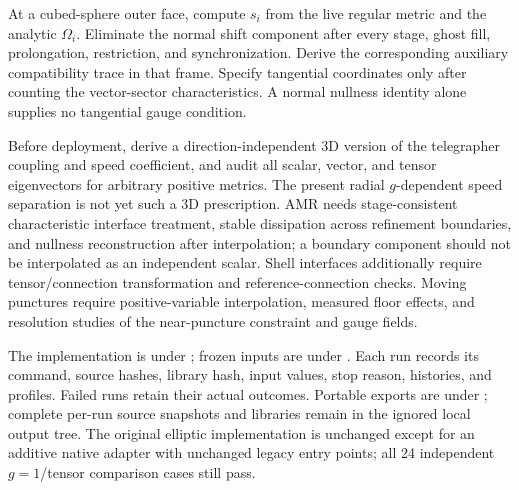 \documentclass[11pt]{article}
\begin{document}
At a cubed-sphere outer face, compute $s_i$ from the live regular metric and the analytic $\Omega_i$. Eliminate the normal shift component after every stage, ghost fill, prolongation, restriction, and synchronization. Derive the corresponding auxiliary compatibility trace in that frame. Specify tangential coordinates only after counting the vector-sector characteristics. A normal nullness identity alone supplies no tangential gauge condition.

Before deployment, derive a direction-independent 3D version of the telegrapher coupling and speed coefficient, and audit all scalar, vector, and tensor eigenvectors for arbitrary positive metrics. The present radial $g$-dependent speed separation is not yet such a 3D prescription. AMR needs stage-consistent characteristic interface treatment, stable dissipation across refinement boundaries, and nullness reconstruction after interpolation; a boundary component should not be interpolated as an independent scalar. Shell interfaces additionally require tensor/connection transformation and reference-connection checks. Moving punctures require positive-variable interpolation, measured floor effects, and resolution studies of the near-puncture constraint and gauge fields.

The implementation is under ; frozen inputs are under . Each run records its command, source hashes, library hash, input values, stop reason, histories, and profiles. Failed runs retain their actual outcomes. Portable exports are under ; complete per-run source snapshots and libraries remain in the ignored local output tree. The original elliptic implementation is unchanged except for an additive native adapter with unchanged legacy entry points; all 24 independent $g=1$/tensor comparison cases still pass.
\end{document}
